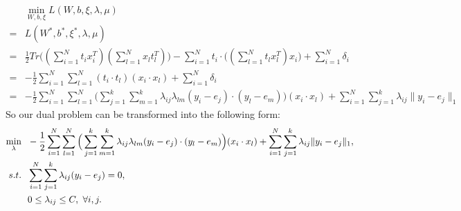 \begin{equation}
\begin{aligned}
&\min_{W,b,\xi} L(W,b,\xi,\lambda,\mu) \\
= &L(W^*,b^*,\xi^*,\lambda,\mu)\\ 
= &\frac{1}{2} Tr\Big((\displaystyle\sum_{i=1}^N t_i x_i^T)(\displaystyle\sum_{l=1}^N x_l t_l^T)\Big) -\displaystyle\sum_{i=1}^N t_i\cdot\Big((\displaystyle\sum_{l=1}^N t_l x_l^T)x_i\Big)+ \displaystyle\sum_{i=1}^N \delta_i\\
= &-\frac{1}{2}\displaystyle\sum_{i=1}^N\sum_{l=1}^N (t_i\cdot t_l)(x_i\cdot x_l)+ \displaystyle\sum_{i=1}^N \delta_i\\
= &-\frac{1}{2}\displaystyle\sum_{i=1}^N\sum_{l=1}^N\Big(\displaystyle\sum_{j=1}^k\sum_{m=1}^k \lambda_{ij}\lambda_{lm}(y_i-e_j)\cdot(y_l-e_m)\Big)(x_i\cdot x_l)+ \displaystyle\sum_{i=1}^N\sum_{j=1}^k\lambda_{ij}\|y_i - e_j\|_1
\end{aligned}
\end{equation}
So our dual problem can be transformed into the following form:
\begin{equation}{\label{SVM_dual}}
\begin{aligned}
\min_{\lambda}&~~ -\frac{1}{2}\displaystyle\sum_{i=1}^N\sum_{l=1}^N\Big(\displaystyle\sum_{j=1}^k\sum_{m=1}^k \lambda_{ij}\lambda_{lm}(y_i-e_j)\cdot(y_l-e_m)\Big)(x_i\cdot x_l)+ \displaystyle\sum_{i=1}^N\sum_{j=1}^k\lambda_{ij}\|y_i - e_j\|_1,\\
s.t.&~~\displaystyle \sum_{i=1}^N\sum_{j=1}^k\lambda_{ij}(y_i - e_j) = 0,\\
     &~~0\leq \lambda_{ij}\leq C,~\forall i,j.
\end{aligned}
\end{equation}


